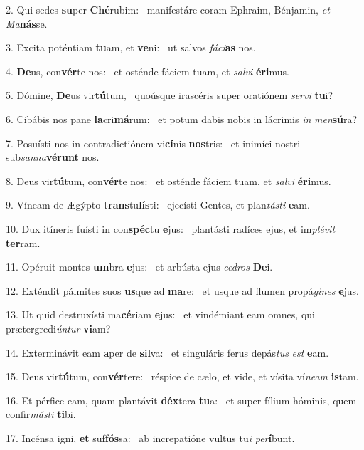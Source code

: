 2. Qui sedes \textbf{su}per \textbf{Ché}rubim: \ast\  manifestáre coram Ephraim, Bénjamin, \textit{et} \textit{Ma}\textbf{nás}se.\

3. Excita poténtiam \textbf{tu}am, et \textbf{ve}ni: \ast\  ut salvos \textit{fá}\textit{ci}\textbf{as} nos.\

4. \textbf{De}us, con\textbf{vér}te nos: \ast\  et osténde fáciem tuam, et \textit{sal}\textit{vi} \textbf{é}\textbf{ri}mus.\

5. Dómine, \textbf{De}us vir\textbf{tú}tum, \ast\  quoúsque irascéris super oratiónem \textit{ser}\textit{vi} \textbf{tu}i?\

6. Cibábis nos pane \textbf{la}cri\textbf{má}rum: \ast\  et potum dabis nobis in lácrimis \textit{in} \textit{men}\textbf{sú}ra?\

7. Posuísti nos in contradictiónem vi\textbf{cí}nis \textbf{nos}tris: \ast\  et inimíci nostri sub\textit{san}\textit{na}\textbf{vé}\textbf{runt} nos.\

8. Deus vir\textbf{tú}tum, con\textbf{vér}te nos: \ast\  et osténde fáciem tuam, et \textit{sal}\textit{vi} \textbf{é}\textbf{ri}mus.\

9. Víneam de Ægýpto \textbf{trans}tu\textbf{lís}ti: \ast\  ejecísti Gentes, et plan\textit{tás}\textit{ti} \textbf{e}am.\

10. Dux itíneris fuísti in con\textbf{spéc}tu \textbf{e}jus: \ast\  plantásti radíces ejus, et im\textit{plé}\textit{vit} \textbf{ter}ram.\

11. Opéruit montes \textbf{um}bra \textbf{e}jus: \ast\  et arbústa ejus \textit{ce}\textit{dros} \textbf{De}i.\

12. Exténdit pálmites suos \textbf{us}que ad \textbf{ma}re: \ast\  et usque ad flumen propá\textit{gi}\textit{nes} \textbf{e}jus.\

13. Ut quid destruxísti ma\textbf{cé}riam \textbf{e}jus: \ast\  et vindémiant eam omnes, qui prætergredi\textit{ún}\textit{tur} \textbf{vi}am?\

14. Exterminávit eam \textbf{a}per de \textbf{sil}va: \ast\  et singuláris ferus depás\textit{tus} \textit{est} \textbf{e}am.\

15. Deus vir\textbf{tú}tum, con\textbf{vér}tere: \ast\  réspice de cælo, et vide, et vísita ví\textit{ne}\textit{am} \textbf{is}tam.\

16. Et pérfice eam, quam plantávit \textbf{déx}tera \textbf{tu}a: \ast\  et super fílium hóminis, quem confir\textit{más}\textit{ti} \textbf{ti}bi.\

17. Incénsa igni, \textbf{et} suf\textbf{fós}sa: \ast\  ab increpatióne vultus tu\textit{i} \textit{per}\textbf{í}bunt.\

